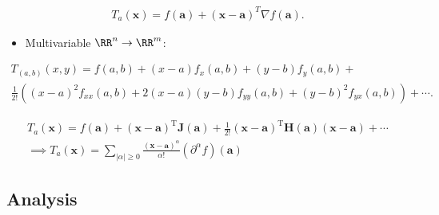 \begin{itemize}
  \begin{align*}  
    T_a(\mathbf x) = f(\mathbf a) + (\mathbf x - \mathbf a)^T\nabla f(\mathbf a)
  .\end{align*}

  \begin{itemize}
  \tightlist
  \item
    Multivariable \(\RR^n \to \RR^m\):
  \end{itemize}

  \begin{align*}  
    T_{(a,b)} ( x , y ) = f ( a , b ) + ( x - a ) f _ { x } ( a , b ) + ( y - b ) f _ { y } ( a , b ) + \\ \frac { 1 } { 2 ! } \left( ( x - a ) ^ { 2 } f _ { x x } ( a , b ) + 2 ( x - a ) ( y - b ) f _ { y y  } ( a , b ) + ( y - b ) ^ { 2 } f _ { y x } ( a , b ) \right) + \cdots
  .\end{align*}

  \begin{align*}
    T_a ( \mathbf { x } ) = f ( \mathbf { a } ) + ( \mathbf { x } - \mathbf { a } ) ^ { \mathrm { T } } \mathbf{J} ( \mathbf { a } ) + \frac { 1 } { 2 ! } ( \mathbf { x } - \mathbf { a } ) ^ { \mathrm { T } } \mathbf{H} ( \mathbf { a } ) ( \mathbf { x } - \mathbf { a } ) + \cdots \\
    \implies T_a ( \mathbf { x } ) = \sum _ { | \alpha | \geq 0 } \frac { ( \mathbf { x } - \mathbf { a } ) ^ { \alpha } } { \alpha ! } \left( \partial ^ { \alpha } f \right) ( \mathbf { a } )
    \end{align*}
\end{itemize}

\hypertarget{analysis}{%
\subsection{Analysis}\label{analysis}}

